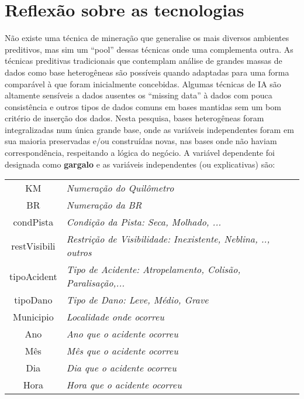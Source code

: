 \section{Reflexão sobre as tecnologias}\label{result}

Não existe uma técnica de mineração que generalise os mais diversos ambientes preditivos, mas sim um ``pool'' dessas técnicas onde uma complementa outra.
As técnicas preditivas tradicionais que contemplam análise de grandes massas de dados como base heterogêneas são possíveis quando adaptadas para uma forma comparável à que
foram inicialmente concebidas. Algumas técnicas de IA são altamente sensíveis a dados ausentes os ``missing data'' à dados com pouca consistência e outros tipos de dados 
comuns em bases mantidas sem um bom critério de inserção dos dados. Nesta pesquisa, bases heterogêneas foram integralizadas num única grande base, onde as variáveis independentes foram
em sua maioria preservadas e/ou construídas novas, nas bases onde não haviam correspondência, respeitando a lógica do negócio. 
A variável dependente foi designada como \textbf{gargalo} e as variáveis independentes (ou explicativas) são: \\

\hspace{1cm}

\begin{tabular}{c  l}
 KM & \textit{Numeração do Quilômetro}\\
 BR & \textit{Numeração da BR}\\
 condPista & \textit{Condição da Pista: Seca, Molhado, ...}\\
 restVisibili & \textit{Restrição de Visibilidade: Inexistente, Neblina, .., outros}\\
 tipoAcident & \textit{Tipo de Acidente: Atropelamento, Colisão, Paralisação,...}\\
 tipoDano  & \textit{Tipo de Dano: Leve, Médio, Grave}\\
 Municipio  & \textit{Localidade onde ocorreu}\\
 Ano & \textit{Ano que o acidente ocorreu}\\
 Mês & \textit{Mês que o acidente ocorreu}\\
 Dia & \textit{Dia que o acidente ocorreu}\\
 Hora & \textit{Hora que o acidente ocorreu}\\
\end{tabular}

\hspace{1cm}
 

